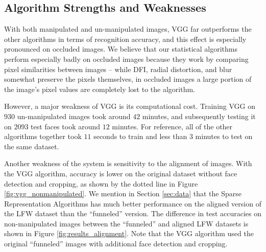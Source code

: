 \documentclass[pageno]{cos429}
\begin{document}
\subsection*{Algorithm Strengths and Weaknesses}
With both manipulated and un-manipulated images, VGG far outperforms the other algorithms in terms of recognition accuracy, and this effect is especially pronounced on occluded images. We believe that our statistical algorithms perform especially badly on occluded images because they work by comparing pixel similarities between images -- while DFI, radial distortion, and blur somewhat preserve the pixels themselves, in occluded images a large portion of the image's pixel values are completely lost to the algorithm.

However, a major weakness of VGG is its computational cost. Training VGG on $930$ un-manipulated images took around $42$ minutes, and subsequently testing it on $2093$ test faces took around $12$ minutes. For reference, all of the other algorithms together took $11$ seconds to train and less than $3$ minutes to test on the same dataset.

Another weakness of the system is sensitivity to the alignment of images. With the VGG algorithm, accuracy is lower on the original dataset without face detection and cropping, as shown by the dotted line in Figure \ref{fig:vgg_nonmanipulated}. We mention in Section \ref{sec:data} that the Sparse Representation Algorithms has much better performance on the aligned version of the LFW dataset than the ``funneled'' version. The difference in test accuracies on non-manipulated images between the ``funneled'' and aligned LFW datasets is shown in Figure \ref{fig:results_alignment}. Note that the VGG algorithm used the original ``funneled'' images with additional face detection and cropping.
\end{document}

